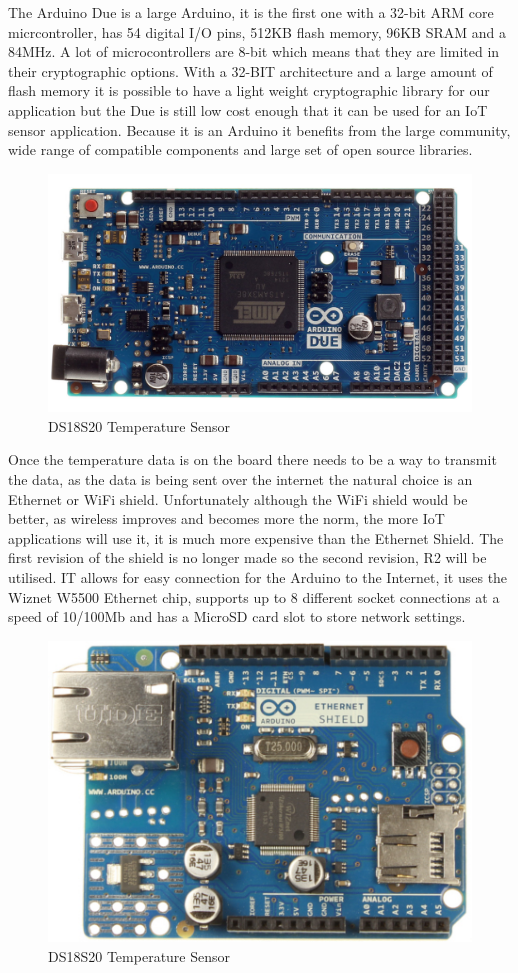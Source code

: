 The Arduino Due is a large Arduino, it is the first one with a 32-bit ARM core micrcontroller, has 54 digital I/O pins, 512KB flash memory, 96KB SRAM and a 84MHz. 
A lot of microcontrollers are 8-bit which means that they are limited in their cryptographic options. With a 32-BIT architecture and a large amount of flash memory it is possible to have a light weight cryptographic library for our application but the Due is still low cost enough that it can be used for an IoT sensor application. Because it is an Arduino it benefits from the large community, wide range of compatible components and large set of open source libraries.

\begin{figure}[h]
	\centering
	\includegraphics[width=.4\linewidth]{Figures/due.jpg}
	\caption{DS18S20 Temperature Sensor}
	\label{fig:ds}
\end{figure}

Once the temperature data is on the board there needs to be a way to transmit the data, as the data is being sent over the internet the natural choice is an Ethernet or WiFi shield. Unfortunately although the WiFi shield would be better, as wireless improves and becomes more the norm, the more IoT applications will use it, it is much more expensive than the Ethernet Shield. The first revision of the shield is no longer made so the second revision, R2 will be utilised. IT allows for easy connection for the Arduino to the Internet, it uses the Wiznet W5500 Ethernet chip, supports up to 8 different socket connections at a speed of 10/100Mb and has a MicroSD card slot to store network settings. 

\begin{figure}[h]
	\centering
	\includegraphics[width=.4\linewidth]{Figures/ethernet.jpg}
	\caption{DS18S20 Temperature Sensor}
	\label{fig:ds}
\end{figure}

